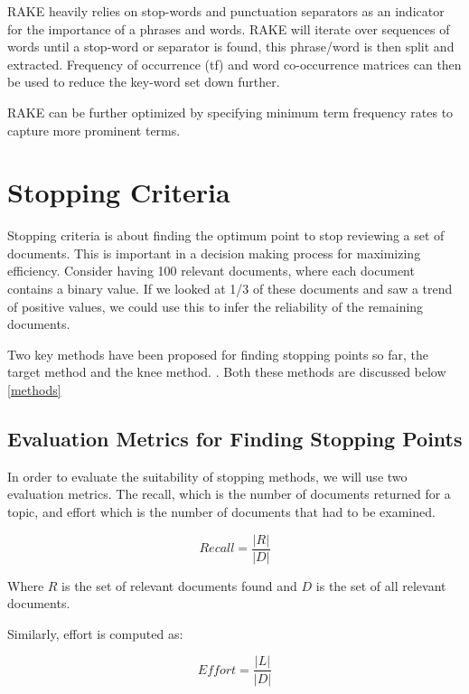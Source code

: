 RAKE heavily relies on stop-words and punctuation separators as an indicator for the importance of a phrases and words. RAKE will iterate over sequences of words until a stop-word or separator is found, this phrase/word is then split and extracted. Frequency of occurrence (tf) and word co-occurrence matrices can then be used to reduce the key-word set down further.

RAKE can be further optimized by specifying minimum term frequency rates to capture more prominent terms.


\section{Stopping Criteria} \label{stops}

Stopping criteria is about finding the optimum point to stop reviewing a set of documents. This is important in a decision making process for maximizing efficiency. Consider having 100 relevant documents, where each document contains a binary value. If we looked at 1/3 of these documents and saw a trend of positive values, we could use this to infer the reliability of the remaining documents.

Two key methods have been proposed for finding stopping points so far, the target method \cite{Satopa11} and the knee method. \cite{Cormack2016}. Both these methods are discussed below \ref{methods}



\subsection{Evaluation Metrics for Finding Stopping Points} \label{evalsstops}

In order to evaluate the suitability of stopping methods, we will use two evaluation metrics. The recall, which is the number of documents returned for a topic, and effort which is the number of documents that had to be examined.

\begin{equation}
Recall = \frac{|R|}{|D|}
\end{equation}

Where $R$ is the set of relevant documents found and $D$ is the set of all relevant documents.

Similarly, effort is computed as:

\begin{equation}
Effort = \frac{|L|}{|D|}
\end{equation}

